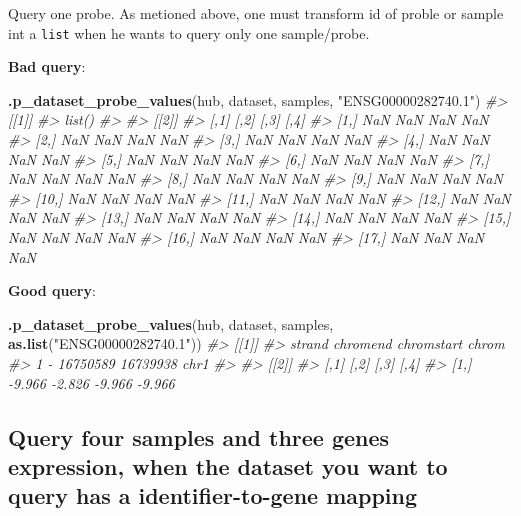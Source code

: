 \documentclass[nofonts,]{tufte-handout}
\newenvironment{Shaded}{\begin{snugshade}}{\end{snugshade}}
\newcommand{\CommentTok}[1]{\textcolor[rgb]{0.56,0.35,0.01}{\textit{#1}}}
\newcommand{\KeywordTok}[1]{\textcolor[rgb]{0.13,0.29,0.53}{\textbf{#1}}}
\newcommand{\NormalTok}[1]{#1}
\newcommand{\StringTok}[1]{\textcolor[rgb]{0.31,0.60,0.02}{#1}}
\begin{document}
Query one probe. As metioned above, one must transform id of proble or
sample int a \texttt{list} when he wants to query only one sample/probe.

\textbf{Bad query}:

\begin{Shaded}
\begin{Highlighting}[]
\KeywordTok{.p_dataset_probe_values}\NormalTok{(hub, dataset, samples, }
    \StringTok{"ENSG00000282740.1"}\NormalTok{)}
\CommentTok{#> [[1]]}
\CommentTok{#> list()}
\CommentTok{#> }
\CommentTok{#> [[2]]}
\CommentTok{#>       [,1] [,2] [,3] [,4]}
\CommentTok{#>  [1,]  NaN  NaN  NaN  NaN}
\CommentTok{#>  [2,]  NaN  NaN  NaN  NaN}
\CommentTok{#>  [3,]  NaN  NaN  NaN  NaN}
\CommentTok{#>  [4,]  NaN  NaN  NaN  NaN}
\CommentTok{#>  [5,]  NaN  NaN  NaN  NaN}
\CommentTok{#>  [6,]  NaN  NaN  NaN  NaN}
\CommentTok{#>  [7,]  NaN  NaN  NaN  NaN}
\CommentTok{#>  [8,]  NaN  NaN  NaN  NaN}
\CommentTok{#>  [9,]  NaN  NaN  NaN  NaN}
\CommentTok{#> [10,]  NaN  NaN  NaN  NaN}
\CommentTok{#> [11,]  NaN  NaN  NaN  NaN}
\CommentTok{#> [12,]  NaN  NaN  NaN  NaN}
\CommentTok{#> [13,]  NaN  NaN  NaN  NaN}
\CommentTok{#> [14,]  NaN  NaN  NaN  NaN}
\CommentTok{#> [15,]  NaN  NaN  NaN  NaN}
\CommentTok{#> [16,]  NaN  NaN  NaN  NaN}
\CommentTok{#> [17,]  NaN  NaN  NaN  NaN}
\end{Highlighting}
\end{Shaded}

\textbf{Good query}:

\begin{Shaded}
\begin{Highlighting}[]
\KeywordTok{.p_dataset_probe_values}\NormalTok{(hub, dataset, samples, }
    \KeywordTok{as.list}\NormalTok{(}\StringTok{"ENSG00000282740.1"}\NormalTok{))}
\CommentTok{#> [[1]]}
\CommentTok{#>   strand chromend chromstart chrom}
\CommentTok{#> 1      - 16750589   16739938  chr1}
\CommentTok{#> }
\CommentTok{#> [[2]]}
\CommentTok{#>        [,1]   [,2]   [,3]   [,4]}
\CommentTok{#> [1,] -9.966 -2.826 -9.966 -9.966}
\end{Highlighting}
\end{Shaded}

\hypertarget{query-four-samples-and-three-genes-expression-when-the-dataset-you-want-to-query-has-a-identifier-to-gene-mapping}{%
\subsection{Query four samples and three genes expression, when the
dataset you want to query has a identifier-to-gene
mapping}\label{query-four-samples-and-three-genes-expression-when-the-dataset-you-want-to-query-has-a-identifier-to-gene-mapping}}
\end{document}
